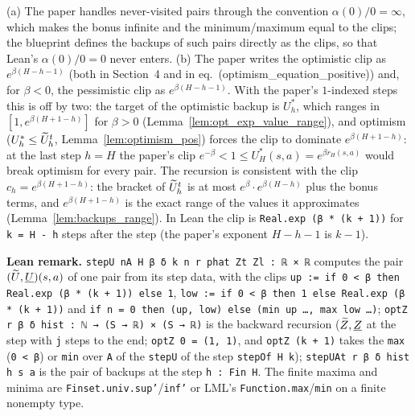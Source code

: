 \begin{remark}\label{rem:algorithm_clips}
(a) The paper handles never-visited pairs through the convention $\alpha(0)/0 = \infty$, which
makes the bonus infinite and the minimum/maximum equal to the clips; the blueprint defines the
backups of such pairs directly as the clips, so that Lean's $\alpha(0)/0 = 0$ never enters.
(b) The paper writes the optimistic clip as $e^{\beta(H - h - 1)}$ (both in Section~4 and in
eq.~(optimism\_equation\_positive)) and, for $\beta < 0$, the pessimistic clip as
$e^{\beta(H - h - 1)}$. With the paper's $1$-indexed steps this is off by two: the target of the
optimistic backup is $U^*_h$, which ranges in $[1, e^{\beta(H + 1 - h)}]$ for $\beta > 0$
(Lemma~\ref{lem:opt_exp_value_range}), and optimism ($U^*_h \le \widetilde{U}^t_h$, Lemma~\ref{lem:optimism_pos})
forces the clip to dominate $e^{\beta(H + 1 - h)}$: at the last step $h = H$ the paper's clip
$e^{-\beta} < 1 \le U^*_H(s, a) = e^{\beta r_H(s, a)}$ would break optimism for every pair. The
recursion is consistent with the clip $c_h = e^{\beta(H + 1 - h)}$: the bracket of $\widetilde{U}^t_h$ is
at most $e^{\beta}\cdot e^{\beta(H - h)}$ plus the bonus terms, and $e^{\beta(H + 1 - h)}$ is the
exact range of the values it approximates (Lemma~\ref{lem:backups_range}). In Lean the clip is
\texttt{Real.exp (β * (k + 1))} for \texttt{k = H - h} steps after the step (the paper's
exponent $H - h - 1$ is $k - 1$).
\end{remark}

\textbf{Lean remark.} \texttt{stepU nA H β δ k n r phat Zt Zl : ℝ × ℝ} computes the pair
$(\widetilde{U}, \underline{U})(s, a)$ of one pair from its step data, with the clips
\texttt{up := if 0 < β then Real.exp (β * (k + 1)) else 1},
\texttt{low := if 0 < β then 1 else Real.exp (β * (k + 1))} and \texttt{if n = 0 then (up, low) else (min up …, max low …)};
\texttt{optZ r β δ hist : ℕ → (S → ℝ) × (S → ℝ)} is the backward recursion
($\widetilde{Z}, \underline{Z}$ at the step with \texttt{j} steps to the end; \texttt{optZ 0 = (1, 1)}, and
\texttt{optZ (k + 1)} takes the \texttt{max} (\texttt{0 < β}) or \texttt{min} over
\texttt{A} of the \texttt{stepU} of the step \texttt{stepOf H k}); \texttt{stepUAt r β δ hist h s a}
is the pair of backups at the step \texttt{h : Fin H}. The finite maxima and minima are
\texttt{Finset.univ.sup'}/\texttt{inf'} or LML's \texttt{Function.max}/\texttt{min} on a
finite nonempty type.

